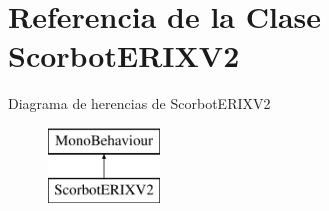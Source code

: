 \hypertarget{class_scorbot_e_r_i_x_v2}{}\section{Referencia de la Clase Scorbot\+E\+R\+I\+X\+V2}
\label{class_scorbot_e_r_i_x_v2}
Diagrama de herencias de Scorbot\+E\+R\+I\+X\+V2\begin{figure}[H]
\begin{center}
\leavevmode
\includegraphics[height=2.000000cm]{class_scorbot_e_r_i_x_v2}
\end{center}
\end{figure}

